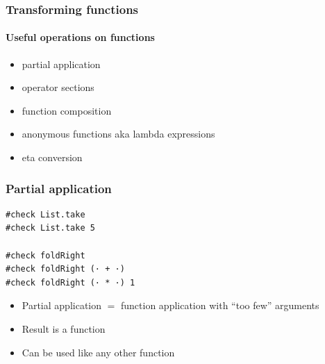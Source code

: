 \documentclass{beamer}
\begin{document}
\begin{frame}
  \frametitle{Transforming functions}
  \framesubtitle{Useful operations on functions}
  \begin{itemize}
  \item partial application
  \item operator sections
  \item function composition
  \item anonymous functions aka lambda expressions
  \item eta conversion
  \end{itemize}
\end{frame}
\begin{frame}[fragile]
  \frametitle{Partial application}
\begin{lstlisting}
#check List.take
#check List.take 5

#check foldRight
#check foldRight (· + ·)
#check foldRight (· * ·) 1
\end{lstlisting}
  \begin{itemize}
  \item Partial application $=$ function application with ``too few'' arguments
  \item Result is a function
  \item Can be used like any other function
  \end{itemize}
\end{frame}
\end{document}
